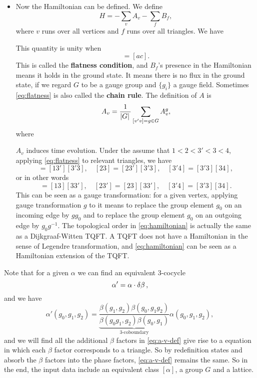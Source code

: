 \documentclass[hyperref, a4paper]{article}
\newcommand*{\concept}[1]{{\textbf{#1}}}
\begin{document}
\begin{itemize}
    \item Now the Hamiltonian can be defined. We define 
    \begin{equation}
        H = - \sum_{v} A_v - \sum_f B_f,
        \label{eq:hamiltonian}
    \end{equation}
    where $v$ runs over all vertices and $f$ runs over all triangles.
    We have
    
    This quantity is unity when 
    \begin{equation}
        [a b] [b c] = [a c].
        \label{eq:flatness}
    \end{equation}
    This is called the \concept{flatness condition}, and $B_f$'s presence in the Hamiltonian means it holds 
    in the ground state. It means there is no flux in the ground state, if we regard $G$ to be a gauge group
    and $\{g_i\}$ a gauge field. Sometimes \eqref{eq:flatness} is also called the \concept{chain rule}.
    The definition of $A$ is 
    \begin{equation}
        A_v = \frac{1}{\abs*{G}} \sum_{[v'v] = g \in G} A_v^g,
    \end{equation}
    where 
    
    $A_v$ induces time evolution. Under the assume that $1 < 2 < 3' < 3 < 4$, 
    applying \eqref{eq:flatness} to relevant triangles, we have 
    \begin{equation}
        [13]=[13'][3'3], \quad [23]=[23'][3'3], \quad [3'4]=[3'3][34],
    \end{equation}
    or in other words 
    \begin{equation}
        [13'] = [13][33'], \quad [23'] = [23][33'], \quad [3'4]=[3'3][34].
        \label{eq:gauge-convention}
    \end{equation}
    This can be seen as a gauge transformation: for a given vertex, applying gauge transformation $g$ to it means 
    to replace the group element $g_0$ on an incoming edge by $g g_0$ and to replace the group element $g_0$ on an 
    outgoing edge by $g_0 g^{-1}$. 
    The topological order in \eqref{eq:hamiltonian} is actually the same as a Dijkgraaf-Witten TQFT.
    A TQFT does not have a Hamiltonian in the sense of Legendre transformation, and \eqref{eq:hamiltonian}
    can be seen as a Hamiltonian extension of the TQFT. %
\end{itemize}

Note that for a given $\alpha$ we can find an equivalent 3-cocycle
\begin{equation}
    \alpha' = \alpha \cdot \var{\beta},
\end{equation}
and we have 
\[
    \alpha'(g_0, g_1, g_2) = \underbrace{\frac{\beta(g_1, g_2) \beta(g_0, g_1 g_2)}{\beta(g_0 g_1, g_2) \beta(g_0, g_1)}}_\text{3-coboundary} \alpha(g_0, g_1, g_2),
\]
and we will find all the additional $\beta$ factors in \eqref{eq:a-v-def} give rise to a equation in which 
each $\beta$ factor corresponds to a triangle. So by redefinition states and absorb the $\beta$ factors into 
the phase factors, \eqref{eq:a-v-def} remains the same. So in the end, the input data include an equivalent 
class $[\alpha]$, a group $G$ and a lattice.
\end{document}
